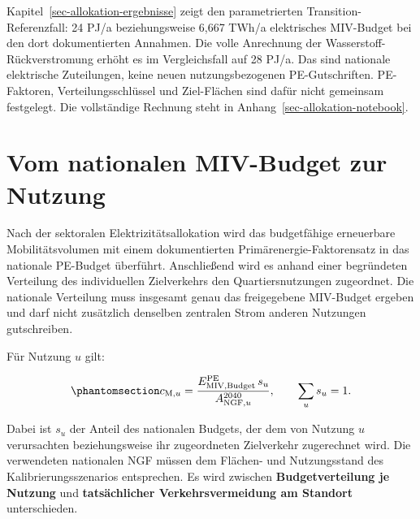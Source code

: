 \documentclass[
  ngerman,
  a4paper,
  DIV=11]{scrreprt}
\begin{document}
\begin{tcolorbox}[enhanced jigsaw, arc=.35mm, bottomrule=.15mm, bottomtitle=1mm, breakable, colback=white, colbacktitle=quarto-callout-note-color!10!white, colframe=quarto-callout-note-color-frame, coltitle=black, left=2mm, leftrule=.75mm, opacityback=0, opacitybacktitle=0.6, rightrule=.15mm, title=\textcolor{quarto-callout-note-color}{\faInfo}\hspace{0.5em}{quantitative Allokation}, titlerule=0mm, toprule=.15mm, toptitle=1mm]

Kapitel~\ref{sec-allokation-ergebnisse} zeigt den parametrierten
Transition-Referenzfall: 24 PJ/a beziehungsweise 6,667 TWh/a
elektrisches MIV-Budget bei den dort dokumentierten Annahmen. Die volle
Anrechnung der Wasserstoff-Rückverstromung erhöht es im Vergleichsfall
auf 28 PJ/a. Das sind nationale elektrische Zuteilungen, keine neuen
nutzungsbezogenen PE-Gutschriften. PE-Faktoren, Verteilungsschlüssel und
Ziel-Flächen sind dafür nicht gemeinsam festgelegt. Die vollständige
Rechnung steht in Anhang~\ref{sec-allokation-notebook}.

\end{tcolorbox}

\section{Vom nationalen MIV-Budget zur
Nutzung}\label{vom-nationalen-miv-budget-zur-nutzung}

Nach der sektoralen Elektrizitätsallokation wird das budgetfähige
erneuerbare Mobilitätsvolumen mit einem dokumentierten
Primärenergie-Faktorensatz in das nationale PE-Budget überführt.
Anschließend wird es anhand einer begründeten Verteilung des
individuellen Zielverkehrs den Quartiersnutzungen zugeordnet. Die
nationale Verteilung muss insgesamt genau das freigegebene MIV-Budget
ergeben und darf nicht zusätzlich denselben zentralen Strom anderen
Nutzungen gutschreiben.

Für Nutzung \(u\) gilt:

\begin{equation}\protect\phantomsection\label{eq-mobilitaetsbudget}{
c_{\mathrm{M},u}
=\frac{E_{\mathrm{MIV,Budget}}^{\mathrm{PE}}\,s_u}
{A_{\mathrm{NGF},u}^{2040}},
\qquad \sum_u s_u=1.
}\end{equation}

Dabei ist \(s_u\) der Anteil des nationalen Budgets, der dem von Nutzung
\(u\) verursachten beziehungsweise ihr zugeordneten Zielverkehr
zugerechnet wird. Die verwendeten nationalen NGF müssen dem Flächen- und
Nutzungsstand des Kalibrierungsszenarios entsprechen. Es wird zwischen
\textbf{Budgetverteilung je Nutzung} und \textbf{tatsächlicher
Verkehrsvermeidung am Standort} unterschieden.
\end{document}
